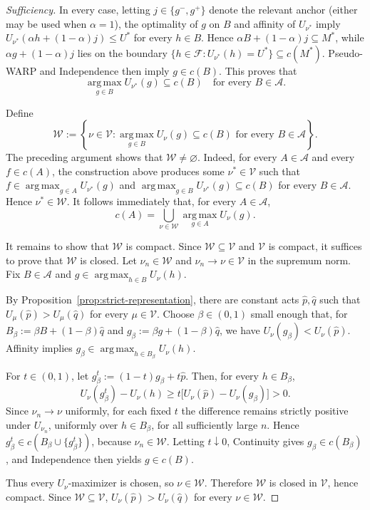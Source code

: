 \documentclass[11pt]{article}
\begin{document}
\begin{proof}[Sufficiency]
In every case, letting $j\in\{g^-,g^+\}$ denote the relevant anchor
(either may be used when $\alpha=1$), the optimality of $g$ on $B$ and
affinity of $U_{\nu^*}$ imply
$U_{\nu^*}(\alpha h+(1-\alpha)j)\leq U^*$ for every $h\in B$.
Hence $\alpha B+(1-\alpha)j\subseteq M^*$, while
$\alpha g+(1-\alpha)j$ lies on the boundary
$\{h\in\mathcal{F}:U_{\nu^*}(h)=U^*\}\subseteq c(M^*)$.
Pseudo-WARP and Independence then imply $g\in c(B)$. This proves that
\[
 \operatorname*{arg\,max}_{g\in B}U_{\nu^*}(g)\subseteq c(B)
 \quad\text{for every }B\in\mathcal{A}.
\]

Define
\[
 \mathcal W:=\left\{\nu\in\mathcal V:
 \operatorname*{arg\,max}_{g\in B}U_\nu(g)\subseteq c(B)
 \text{ for every }B\in\mathcal A\right\}.
\]
The preceding argument shows that $\mathcal W\neq\varnothing$.
Indeed, for every $A\in\mathcal A$ and every $f\in c(A)$, the
construction above produces some $\nu^*\in\mathcal V$ such that
$f\in\operatorname*{arg\,max}_{g\in A}U_{\nu^*}(g)$ and
$\operatorname*{arg\,max}_{g\in B}U_{\nu^*}(g)\subseteq c(B)$ for
every $B\in\mathcal A$. Hence $\nu^*\in\mathcal W$. It follows
immediately that, for every $A\in\mathcal A$,
\[
 c(A)=\bigcup_{\nu\in\mathcal W}
 \operatorname*{arg\,max}_{g\in A}U_\nu(g).
\]

It remains to show that $\mathcal W$ is compact. Since
$\mathcal W\subseteq\mathcal V$ and $\mathcal V$ is compact, it
suffices to prove that $\mathcal W$ is closed. Let
$\nu_n\in\mathcal W$ and $\nu_n\to\nu\in\mathcal V$ in the
supremum norm. Fix $B\in\mathcal A$ and
$g\in\operatorname*{arg\,max}_{h\in B}U_\nu(h)$.

By Proposition~\ref{prop:strict-representation}, there are constant
acts $\hat p,\hat q$ such that $U_\mu(\hat p)>U_\mu(\hat q)$ for
every $\mu\in\mathcal V$. Choose $\beta\in(0,1)$ small enough that,
for $B_\beta:=\beta B+(1-\beta)\hat q$ and
$g_\beta:=\beta g+(1-\beta)\hat q$, we have
$U_\nu(g_\beta)<U_\nu(\hat p)$. Affinity implies
$g_\beta\in\operatorname*{arg\,max}_{h\in B_\beta}U_\nu(h)$.

For $t\in(0,1)$, let $g_\beta^t:=(1-t)g_\beta+t\hat p$.
Then, for every $h\in B_\beta$,
\[
 U_\nu(g_\beta^t)-U_\nu(h)
 \geq t\bigl[U_\nu(\hat p)-U_\nu(g_\beta)\bigr]>0.
\]
Since $\nu_n\to\nu$ uniformly, for each fixed $t$ the difference
remains strictly positive under $U_{\nu_n}$, uniformly over
$h\in B_\beta$, for all sufficiently large $n$. Hence
$g_\beta^t\in c(B_\beta\cup\{g_\beta^t\})$, because
$\nu_n\in\mathcal W$. Letting $t\downarrow0$, Continuity gives
$g_\beta\in c(B_\beta)$, and Independence then yields $g\in c(B)$.

Thus every $U_\nu$-maximizer is chosen, so $\nu\in\mathcal W$.
Therefore $\mathcal W$ is closed in $\mathcal V$, hence compact.
Since $\mathcal W\subseteq\mathcal V$,
$U_\nu(\hat p)>U_\nu(\hat q)$ for every $\nu\in\mathcal W$.
\renewcommand{\qedsymbol}{$\blacksquare$}
\end{proof}
\end{document}
